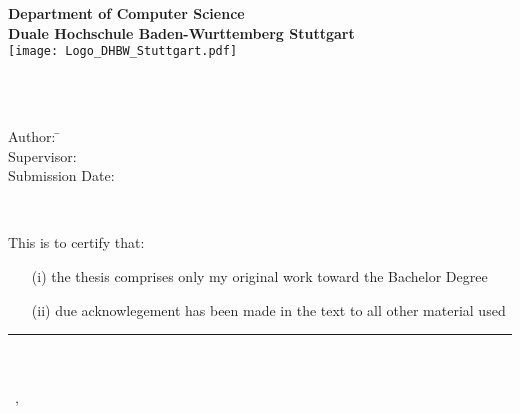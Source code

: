 \newcommand{\titlePage}{

\thispagestyle{empty}
\begin{center}
	\textbf{Department of Computer Science}\\[1mm]
	\textbf{Duale Hochschule Baden-Wurttemberg Stuttgart}\\[1mm]
	\texttt{[image: Logo\_DHBW\_Stuttgart.pdf]}
	
	\vspace{2cm}
	\doublespacing
	{\Huge \textbf{\titleOfThesisOne}}\\
	\singlespacing
	\vspace{2cm}
	{\large \textbf{\typeOfThesis}}\\
	
	\vfill
	\parbox{1cm}{
  		\begin{large}
    			\begin{tabbing}
       			Author: \hspace{2cm}  
        			\=\authorOfThesis\\[2mm]
      			Supervisor: 
        			\>\supervisorOne\\[2mm]
      			Submission Date: 
        			\>\submissionDate\\
    			\end{tabbing}
  		\end{large}
	}\\
\end{center}
\clearpage
}
\titlePage
\thispagestyle{empty}
This is to certify that:
\begin{itemize}
\item[(i)] the thesis comprises only my original work toward the Bachelor Degree
\item[(ii)] due acknowlegement has been made in the text to all other material used
\end{itemize}

\vspace{2cm}
\begin{flushright}
\rule[0mm]{6cm}{0.2mm}\\
\authorOfThesis\\
\submissionDay~\submissionMonth,~\submissionYear\\
\end{flushright}
\clearpage

